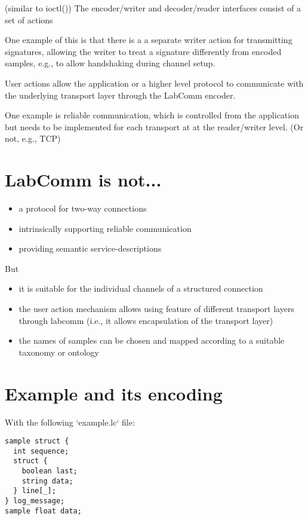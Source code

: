 \documentclass[a4paper]{article}
\begin{document}
(similar to ioctl()) 
The encoder/writer and decoder/reader interfaces consist of a set of actions

One example of this is that there is a a separate writer action for
transmitting signatures, allowing the writer to treat a signature differently
from encoded samples, e.g., to allow handshaking during channel setup.

User actions allow the application or a higher level
protocol to communicate with the underlying transport layer through the LabComm
encoder. 

One example is reliable communication, which is controlled from the application
but needs to be implemented for each transport at at the reader/writer level.
(Or not, e.g., TCP)

\section{LabComm is not...}

\begin{itemize}
\item a protocol for two-way connections
\item intrinsically supporting reliable communication 
\item providing semantic service-descriptions
\end{itemize}

But

\begin{itemize}
\item it is suitable for the individual channels of a structured connection
\item the user action mechanism allows using feature of different transport layers
  through labcomm (i.e., it allows encapsulation of the transport layer)
\item the names of samples can be chosen and mapped according to a suitable taxonomy or ontology
\end{itemize}



\section{Example and its encoding}

With the following `example.lc` file:

\begin{verbatim}
sample struct {
  int sequence;
  struct {
    boolean last;
    string data;
  } line[_];
} log_message;
sample float data;
\end{verbatim}
\end{document}
